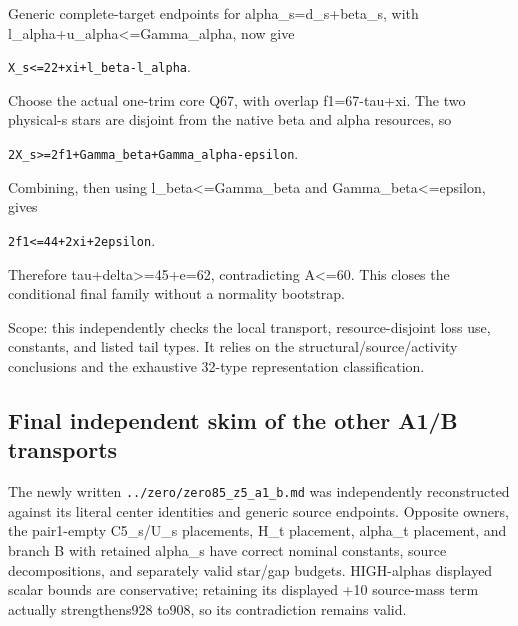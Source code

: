\documentclass[10pt,a4paper]{article}
\theoremstyle{definition}
\begin{document}
Generic complete-target endpoints for alpha\_\allowbreak{}s=\allowbreak{}d\_\allowbreak{}s+\allowbreak{}beta\_\allowbreak{}s,\allowbreak{} with
l\_\allowbreak{}alpha+\allowbreak{}u\_\allowbreak{}alpha\textless=\allowbreak{}Gamma\_\allowbreak{}alpha,\allowbreak{} now give

\texttt{X\_\allowbreak{}\allowbreak{}s<=\allowbreak{}22+\allowbreak{}xi+\allowbreak{}l\_\allowbreak{}\allowbreak{}beta-l\_\allowbreak{}\allowbreak{}alpha}.

Choose the actual one-trim core Q67,\allowbreak{} with overlap f1=\allowbreak{}67-tau+\allowbreak{}xi. The two
physical-s stars are disjoint from the native beta and alpha resources,\allowbreak{}
so

\texttt{2X\_\allowbreak{}\allowbreak{}s>=\allowbreak{}2f1+\allowbreak{}Gamma\_\allowbreak{}\allowbreak{}beta+\allowbreak{}Gamma\_\allowbreak{}\allowbreak{}alpha-epsilon}.

Combining,\allowbreak{} then using l\_\allowbreak{}beta\textless=\allowbreak{}Gamma\_\allowbreak{}beta and
Gamma\_\allowbreak{}beta\textless=\allowbreak{}epsilon,\allowbreak{} gives

\texttt{2f1<=\allowbreak{}44+\allowbreak{}2xi+\allowbreak{}2epsilon}.

Therefore tau+\allowbreak{}delta\textgreater=\allowbreak{}45+\allowbreak{}e=\allowbreak{}62,\allowbreak{} contradicting A\textless=\allowbreak{}60.
This closes the conditional final family without a normality bootstrap.

Scope: this independently checks the local transport,\allowbreak{} resource-disjoint
loss use,\allowbreak{} constants,\allowbreak{} and listed tail types. It relies on the
structural/source/activity conclusions and the exhaustive 32-type
representation classification.

\hypertarget{final-independent-skim-of-the-other-a1b-transports}{%
\subsection{Final independent skim of the other A1/B
transports}\label{final-independent-skim-of-the-other-a1b-transports}}

The newly written \texttt{../\allowbreak{}zero/\allowbreak{}zero85\_\allowbreak{}\allowbreak{}z5\_\allowbreak{}\allowbreak{}a1\_\allowbreak{}\allowbreak{}b.md}
was independently reconstructed against its literal center identities
and generic source endpoints. Opposite owners,\allowbreak{} the pair1-empty
C5\_\allowbreak{}s/U\_\allowbreak{}s placements,\allowbreak{} H\_\allowbreak{}t placement,\allowbreak{} alpha\_\allowbreak{}t placement,\allowbreak{} and branch B
with retained alpha\_\allowbreak{}s have correct nominal constants,\allowbreak{} source
decompositions,\allowbreak{} and separately valid star/gap budgets.
HIGH-alpha\textquotesingle s displayed scalar bounds are conservative;
retaining its displayed +\allowbreak{}10 source-mass term actually strengthens928
to908,\allowbreak{} so its contradiction remains valid.
\end{document}
